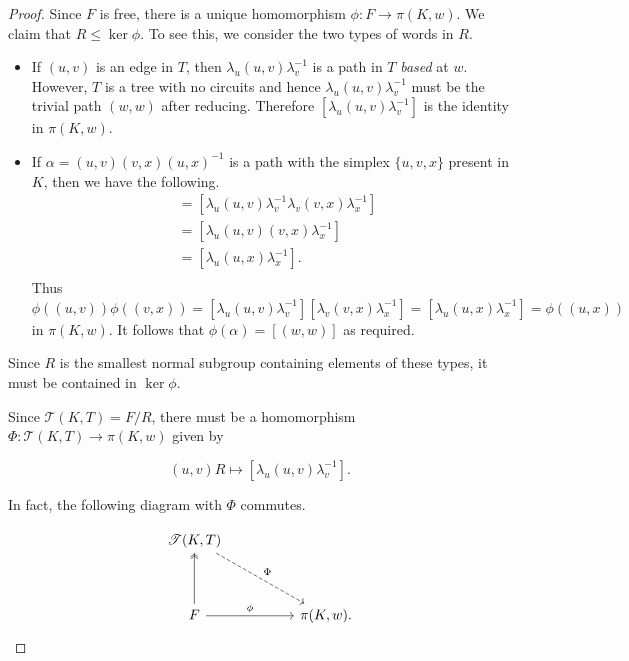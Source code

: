\documentclass[12pt]{article}
\theoremstyle{definition}
\numberwithin{equation}{theorem}
\begin{document}
\begin{proof}
Since $F$ is free, there is a unique homomorphism $\phi: F \rightarrow \pi(K,w)$. We claim that $R \leq \ker \phi$. To see this, we consider the two types of words in $R$.
\begin{itemize}
\item If $(u,v)$ is an edge in $T$, then $\lambda_u (u,v) \lambda_v^{-1}$ is a path in $T$ \emph{based} at $w$. However, $T$ is a tree with no circuits and hence $\lambda_u (u,v) \lambda_v^{-1}$ must be the trivial path $(w,w)$ after reducing. Therefore $[\lambda_u (u,v) \lambda_v^{-1}]$ is the identity in $\pi(K,w)$.
\item If $\alpha = (u,v)(v,x)(u,x)^{-1}$ is a path with the simplex $\{ u,v,x \}$ present in $K$, then we have the following.
  \begin{align*}
    [\lambda_u (u,v) \lambda_v^{-1}][\lambda_v (v,x) \lambda_x^{-1}] &= [\lambda_u (u,v) \lambda_v^{-1}\lambda_v (v,x) \lambda_x^{-1}] \\
                                                                     &= [\lambda_u (u,v)(v,x) \lambda_x^{-1}] \\
                                                                     &= [\lambda_u (u,x) \lambda_x^{-1}]. \\
  \end{align*}
  Thus $\phi((u,v))\phi((v,x)) = [\lambda_u (u,v) \lambda_v^{-1}][\lambda_v (v,x) \lambda_x^{-1}] = [\lambda_u (u,x) \lambda_x^{-1}] = \phi((u,x))$ in $\pi(K,w)$. It follows that $\phi(\alpha) = [(w,w)]$ as required.
\end{itemize}
Since $R$ is the smallest normal subgroup containing elements of these types, it must be contained in $\ker \phi$.

Since $\mathcal{T}(K,T) = F/R$, there must be a homomorphism $\Phi: \mathcal{T}(K,T) \rightarrow \pi(K,w)$ given by

\begin{equation*}
  (u,v)R \mapsto [\lambda_u (u,v) \lambda_v^{-1}].
\end{equation*}

In fact, the following diagram with $\Phi$ commutes.

\begin{equation*}
  \begin{tikzcd}[ampersand replacement=\&, sep=huge]
    \mathcal{T}(K,T) \arrow[dr,dashrightarrow,"\Phi"] \\
    F \arrow[u,twoheadrightarrow] \arrow[r,"\phi"] \& \pi(K,w).
  \end{tikzcd}
\end{equation*}


\end{proof}
\end{document}
